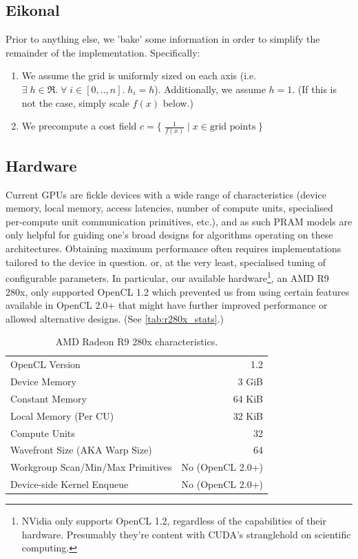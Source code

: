 \documentclass[11pt]{article}       %
\begin{document}
\subsection{Eikonal}

Prior to anything else, we 'bake' some information in order to simplify the remainder of the implementation. Specifically:
\begin{enumerate}[noitemsep]
\item We assume the grid is uniformly sized on each axis (i.e. $\exists \; h \in \Re. \; \forall \; i \in [0, .., n]. \; h_i = h$). Additionally, we assume $h = 1$. (If this is not the case, simply scale $f(x)$ below.)
\item We precompute a cost field $c = \{ \; \frac{1}{f(x)}  \; | \; x \in \text{grid points} \; \}$
\end{enumerate}



\subsection{Hardware}

Current GPUs are fickle devices with a wide range of characteristics (device memory, local memory, access latencies, number of compute units, specialised per-compute unit communication primitives, etc.), and as such PRAM models are only helpful for guiding one's broad designs for algorithms operating on these architectures. Obtaining maximum performance often requires implementations tailored to the device in question. or, at the very least, specialised tuning of configurable parameters. In particular, our available hardware\footnote{NVidia only supports OpenCL 1.2, regardless of the capabilities of their hardware. Presumably they're content with CUDA's stranglehold on scientific computing.}, an AMD R9 280x, only supported OpenCL 1.2 which prevented us from using certain features available in OpenCL 2.0+ that might have further improved performance or allowed alternative designs. (See \autoref{tab:r280x_stats}.)

\begin{table}
\centering
\begin{tabular}{|l|r|}
\cline{1-2} OpenCL Version						& 1.2    \\
\cline{1-2} Device Memory						& 3 GiB  \\
\cline{1-2} Constant Memory						& 64 KiB \\
\cline{1-2} Local Memory (Per CU)				& 32 KiB \\
\cline{1-2} Compute Units						& 32     \\
\cline{1-2} Wavefront Size (AKA Warp Size)		& 64     \\
\cline{1-2} Workgroup Scan/Min/Max Primitives	& No (OpenCL 2.0+) \\
\cline{1-2} Device-side Kernel Enqueue			& No (OpenCL 2.0+) \\
\cline{1-2}
\end{tabular}
\caption{AMD Radeon R9 280x characteristics.}
\label{tab:r280x_stats}
\end{table}
\end{document}
